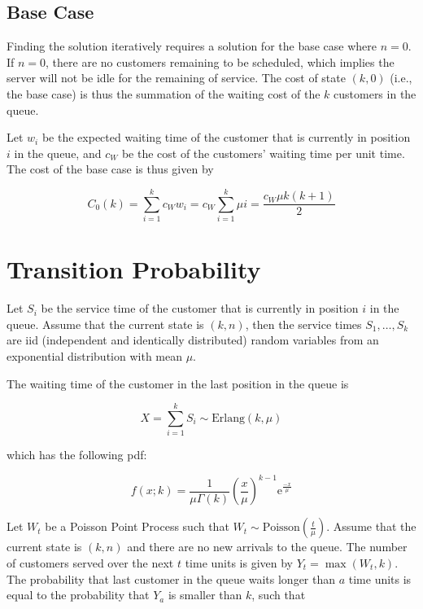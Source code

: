 \subsection{Base Case}

Finding the solution iteratively requires a solution for the base case where $n = 0$. If $n = 0$, there are no customers remaining to be scheduled, which implies the server will not be idle for the remaining of service. The cost of state $(k, 0)$ (i.e., the base case) is thus the summation of the waiting cost of the $k$ customers in the queue.

Let $w_{i}$ be the expected waiting time of the customer that is currently in position $i$ in the queue, and $c_{W}$ be the cost of the customers' waiting time per unit time. The cost of the base case is thus given by

\begin{equation}
 	C_{0} (k) = \sum_{i = 1}^{k} c_{W} w_{i} = c_{W} \sum_{i = 1}^{k} \mu i = \frac{c_{W} \mu k (k + 1)}{2}
\end{equation}

\section{Transition Probability}

Let $S_{i}$ be the service time of the customer that is currently in position $i$ in the queue. Assume that the current state is $(k, n)$, then the service times $S_{1}, \ldots, S_{k}$ are iid (independent and identically distributed) random variables from an exponential distribution with mean $\mu$.

The waiting time of the customer in the last position in the queue is

\begin{equation}
	X = \sum_{i = 1}^{k} S_{i} \sim \text{Erlang}(k, \mu)
\end{equation}

which has the following pdf:

\begin{equation}
	f (x; k) = \frac{1}{\mu \Gamma (k)} \left( \frac{x}{\mu} \right)^{k - 1} \mathrm{e}^{\frac{-x}{\mu}}
\end{equation}

Let $W_{t}$ be a Poisson Point Process such that $W_{t} \sim \text{Poisson} \left( \frac{t}{\mu} \right)$. Assume that the current state is $(k, n)$ and there are no new arrivals to the queue. The number of customers served over the next $t$ time units is given by $Y_{t} = \max (W_{t}, k)$. The probability that last customer in the queue waits longer than $a$ time units is equal to the probability that $Y_{a}$ is smaller than $k$, such that

